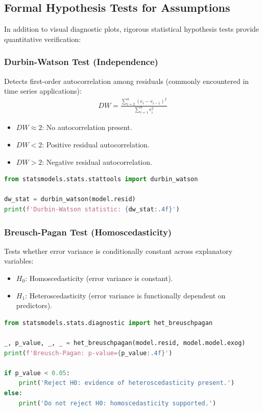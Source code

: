 \subsection{Formal Hypothesis Tests for Assumptions}

In addition to visual diagnostic plots, rigorous statistical hypothesis tests provide quantitative verification:

\subsubsection{Durbin-Watson Test (Independence)}

Detects first-order autocorrelation among residuals (commonly encountered in time series applications):
\begin{align}
	DW = \frac{\sum_{i=2}^{n} (e_i - e_{i-1})^2}{\sum_{i=1}^{n} e_i^2}
\end{align}

\begin{itemize}
	\item $DW \approx 2$: No autocorrelation present.
	\item $DW < 2$: Positive residual autocorrelation.
	\item $DW > 2$: Negative residual autocorrelation.
\end{itemize}

\begin{lstlisting}[language=Python]
from statsmodels.stats.stattools import durbin_watson

dw_stat = durbin_watson(model.resid)
print(f'Durbin-Watson statistic: {dw_stat:.4f}')
\end{lstlisting}

\subsubsection{Breusch-Pagan Test (Homoscedasticity)}

Tests whether error variance is conditionally constant across explanatory variables:
\begin{itemize}
	\item $H_0$: Homoscedasticity (error variance is constant).
	\item $H_1$: Heteroscedasticity (error variance is functionally dependent on predictors).
\end{itemize}

\begin{lstlisting}[language=Python]
from statsmodels.stats.diagnostic import het_breuschpagan

_, p_value, _, _ = het_breuschpagan(model.resid, model.model.exog)
print(f'Breusch-Pagan: p-value={p_value:.4f}')

if p_value < 0.05:
    print('Reject H0: evidence of heteroscedasticity present.')
else:
    print('Do not reject H0: homoscedasticity supported.')
\end{lstlisting}

